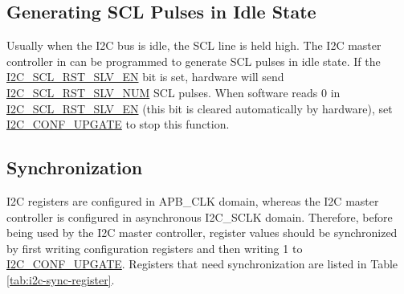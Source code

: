 \documentclass[main\_\_EN.tex]{subfiles}
\begin{document}
\subsection{Generating SCL Pulses in Idle State}
Usually when the I2C bus is idle, the SCL line is held high. The I2C master controller in \chipname{} can be programmed to generate SCL pulses in idle state. If the \hyperref[fielddesc:I2CSCLRSTSLVEN]{I2C\_SCL\_RST\_SLV\_EN} bit is set, hardware will send \hyperref[fielddesc:I2CSCLRSTSLVNUM]{I2C\_SCL\_RST\_SLV\_NUM} SCL pulses. When software reads 0 in  \hyperref[fielddesc:I2CSCLRSTSLVEN]{I2C\_SCL\_RST\_SLV\_EN} (this bit is cleared automatically by hardware), set \hyperref[fielddesc:I2CCONFUPGATE]{I2C\_CONF\_UPGATE} to stop this function.

\subsection{Synchronization}
I2C registers are configured in APB\_CLK domain, whereas the I2C master controller is configured in asynchronous I2C\_SCLK domain. Therefore, before being used by the I2C master controller, register values should be synchronized by first writing configuration registers and then writing 1 to \hyperref[fielddesc:I2CCONFUPGATE]{I2C\_CONF\_UPGATE}. Registers that need synchronization are listed in Table \ref{tab:i2c-sync-register}.
\end{document}
